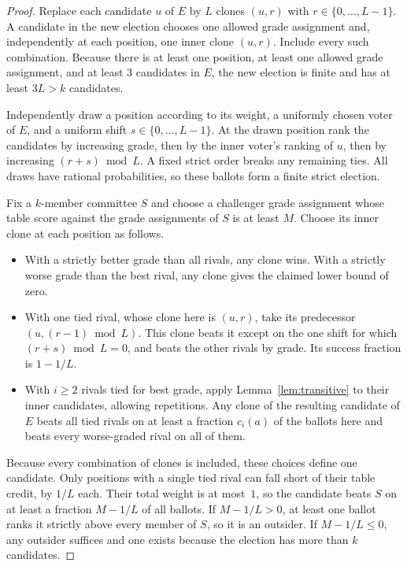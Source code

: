 \documentclass[11pt,letterpaper]{article}
\theoremstyle{cleanthm}
\begin{document}
\begin{proof}
Replace each candidate \(u\) of \(E\) by \(L\) clones \((u,r)\) with \(r\in\{0,\ldots,L-1\}\). A
candidate in the new election chooses one allowed grade assignment and, independently at each
position, one inner clone \((u,r)\). Include every such combination. Because there is at least one
position, at least one allowed grade assignment, and at least \(3\) candidates in \(E\), the new
election is finite and has at least \(3L>k\) candidates.

Independently draw a position according to its weight, a uniformly chosen voter of \(E\), and a
uniform shift \(s\in\{0,\ldots,L-1\}\). At the drawn position rank the candidates by increasing
grade, then by the inner voter's ranking of \(u\), then by increasing \((r+s)\bmod L\). A fixed
strict order breaks any remaining ties. All draws have rational probabilities, so these ballots
form a finite strict election.

Fix a \(k\)-member committee \(S\) and choose a challenger grade assignment whose table score
against the grade assignments of \(S\) is at least \(M\). Choose its inner clone at each position
as follows.
\begin{itemize}
 \item With a strictly better grade than all rivals, any clone wins. With a strictly worse grade
   than the best rival, any clone gives the claimed lower bound of zero.
 \item With one tied rival, whose clone here is \((u,r)\), take its predecessor
   \((u,(r-1)\bmod L)\). This clone beats it except on the one shift for which \((r+s)\bmod L=0\),
   and beats the other rivals by grade. Its success fraction is \(1-1/L\).
 \item With \(i\ge2\) rivals tied for best grade, apply Lemma~\ref{lem:transitive} to their inner
   candidates, allowing repetitions. Any clone of the resulting candidate of \(E\) beats all tied
   rivals on at least a fraction \(c_i(a)\) of the ballots here and beats every worse-graded rival
   on all of them.
\end{itemize}
Because every combination of clones is included, these choices define one candidate. Only
positions with a single tied rival can fall short of their table credit, by \(1/L\) each. Their
total weight is at most~\(1\), so the candidate beats \(S\) on at least a fraction \(M-1/L\) of
all ballots. If \(M-1/L>0\), at least one ballot ranks it strictly above every member of \(S\), so
it is an outsider. If \(M-1/L\le0\), any outsider suffices and one exists because the election has
more than \(k\) candidates.
\end{proof}
\end{document}
